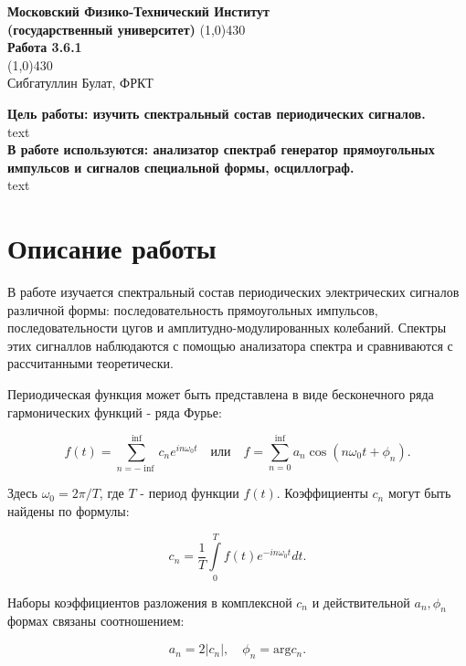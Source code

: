 \documentclass[a4paper, 12pt]{article}%
\begin{document}
\begin{titlepage}

\begin{center}
\large\textbf{Московский Физико-Технический Институт}\\
\large\textbf{(государственный университет)}
\vfill
\line(1,0){430}\\[1mm]
\huge\textbf{Работа 3.6.1}\\
\line(1,0){430}\\[1mm]
\vfill
\large Сибгатуллин Булат, ФРКТ\\
\end{center}

\end{titlepage}
\noindent \textbf{Цель работы: изучить спектральный состав периодических сигналов.} \\
\indent text\\
\noindent \textbf{В работе используются: анализатор спектраб генератор прямоугольных импульсов и сигналов специальной формы, осциллограф.} \\
\indent text

\section*{Описание работы}

В работе изучается спектральный состав периодических электрических сигналов различной формы: последовательность прямоугольных импульсов, последовательности цугов и амплитудно-модулированных колебаний. Спектры этих сигналлов наблюдаются с помощью анализатора спектра и сравниваются с рассчитанными теоретически.

Периодическая функция может быть представлена в виде бесконечного ряда гармонических функций - ряда Фурье:

\[f(t) = \sum\limits_{n = -\inf}^{\inf} c_n e^{in\omega_0 t} \quad \text{или} \quad 
f = \sum\limits_{n = 0}^{\inf} a_n \cos (n \omega_0 t + \phi_n ).\]

Здесь $\omega_0 = 2\pi /T$, где $T$ - период функции $f(t)$. Коэффициенты ${c_n}$ могут быть найдены по формулы:

\[c_n = \frac{1}{T} \int\limits_0^T f(t) e^{-in \omega_0 t} dt.\]

Наборы коэффициентов разложения в комплексной ${c_n}$ и действительной ${a_n, \phi_n}$ формах связаны соотношением:

\[a_n = 2 | c_n |, \quad \phi_n = \text{arg}c_n.\]
\end{document}
